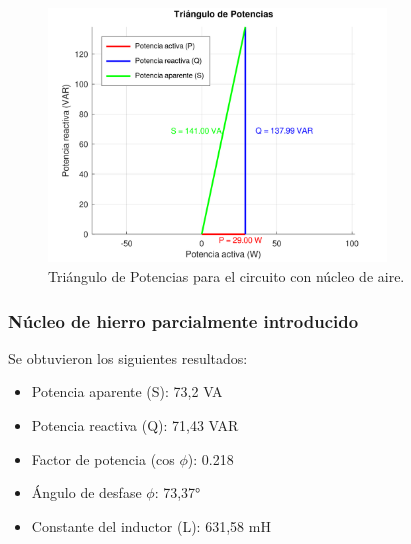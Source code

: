 \documentclass{article}
\begin{document}
                        \begin{figure}[H]
                            \centering
                            \includegraphics[width=0.8\textwidth]{graficoAire.png}
                            \caption{Triángulo de Potencias para el circuito con núcleo de aire.}
                            \label{fig:graficoAire}
                        \end{figure}
                    
                    \subsubsection{Núcleo de hierro parcialmente introducido}
                        
                        Se obtuvieron los siguientes resultados:
                        \begin{itemize}
                            \item Potencia aparente (S): 73,2 VA
                            \item Potencia reactiva (Q): 71,43 VAR
                            \item Factor de potencia (cos $\phi$): 0.218
                            \item Ángulo de desfase $\phi$: 73,37°
                            \item Constante del inductor (L): 631,58 mH
                        \end{itemize}
\end{document}
